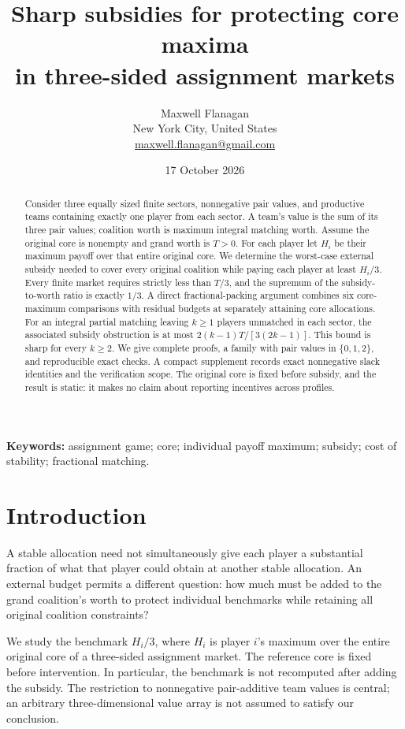 \documentclass[11pt]{article}
\title{Sharp subsidies for protecting core maxima\\in three-sided assignment markets}
\author{Maxwell Flanagan\\\small New York City, United States\\\small\href{mailto:maxwell.flanagan@gmail.com}{maxwell.flanagan@gmail.com}}
\date{17 October 2026}
\theoremstyle{remark}
\begin{document}
\maketitle

\begin{abstract}
Consider three equally sized finite sectors, nonnegative pair values, and
productive teams containing exactly one player from each sector. A team's
value is the sum of its three pair values; coalition worth is maximum integral
matching worth. Assume the original core is nonempty and grand worth is
$T>0$. For each player let $H_i$ be their maximum payoff over that entire
original core. We determine the worst-case external subsidy needed to cover
every original coalition while paying each player at least $H_i/3$.
Every finite market requires strictly less than $T/3$, and the supremum of
the subsidy-to-worth ratio is exactly $1/3$. A direct fractional-packing
argument combines six core-maximum comparisons with residual budgets at
separately attaining core allocations. For an integral partial matching
leaving $k\ge1$ players unmatched in each sector, the associated subsidy
obstruction is at most $2(k-1)T/[3(2k-1)]$. This bound is sharp for every
$k\ge2$. We give complete proofs, a family with pair values in
$\{0,1,2\}$, and reproducible exact checks. A compact supplement records exact nonnegative slack identities and the
verification scope. The original core is fixed before subsidy, and the result
is static: it makes no claim about reporting incentives across profiles.
\end{abstract}
\noindent\textbf{Keywords:} assignment game; core; individual payoff maximum;
subsidy; cost of stability; fractional matching.

\section{Introduction}
A stable allocation need not simultaneously give each player a substantial
fraction of what that player could obtain at another stable allocation.
An external budget permits a different question: how much must be added to
the grand coalition's worth to protect individual benchmarks while retaining
all original coalition constraints?

We study the benchmark $H_i/3$, where $H_i$ is player $i$'s maximum over the
entire original core of a three-sided assignment market. The reference core
is fixed before intervention. In particular, the benchmark is not recomputed
after adding the subsidy. The restriction to nonnegative pair-additive team
values is central; an arbitrary three-dimensional value array is not assumed
to satisfy our conclusion.
\end{document}
